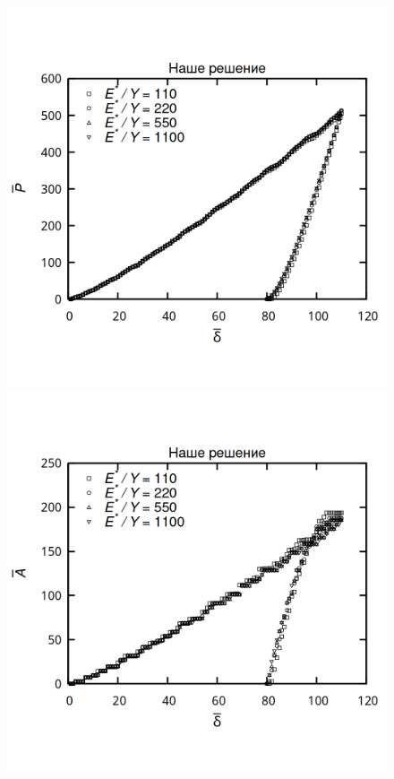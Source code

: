 \documentclass[]{article}
\begin{document}
\begin{figure}[h!]
	\centering
	\includegraphics[height=0.25\textheight]{pictures/bP_bd.png}
	\includegraphics[height=0.25\textheight]{pictures/bA_bd_low.png}

\end{figure}
\end{document}

